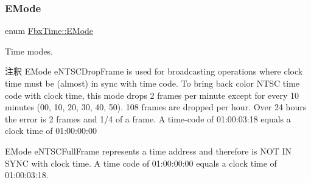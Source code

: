 \subsubsection{\texorpdfstring{E\+Mode}{EMode}}
{\footnotesize\ttfamily enum \hyperlink{class_fbx_time_acc529b00a0e8d4c3da3702449ca93031}{Fbx\+Time\+::\+E\+Mode}}

Time modes. \begin{DoxyRemark}{注釈}
E\+Mode {\ttfamily e\+N\+T\+S\+C\+Drop\+Frame} is used for broadcasting operations where clock time must be (almost) in sync with time code. To bring back color N\+T\+SC time code with clock time, this mode drops 2 frames per minute except for every 10 minutes (00, 10, 20, 30, 40, 50). 108 frames are dropped per hour. Over 24 hours the error is 2 frames and 1/4 of a frame. A time-\/code of 01\+:00\+:03\+:18 equals a clock time of 01\+:00\+:00\+:00
\end{DoxyRemark}
\begin{DoxyParagraph}{}
E\+Mode {\ttfamily e\+N\+T\+S\+C\+Full\+Frame} represents a time address and therefore is N\+OT IN S\+Y\+NC with clock time. A time code of 01\+:00\+:00\+:00 equals a clock time of 01\+:00\+:03\+:18.
\end{DoxyParagraph}

